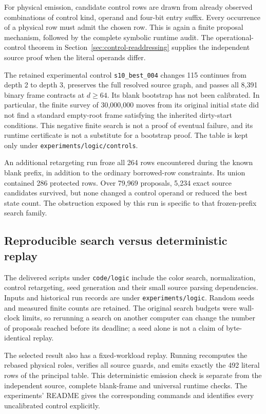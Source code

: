 For physical emission, candidate control rows are drawn from already
observed combinations of control kind, operand and four-bit entry suffix.
Every occurrence of a physical row must admit the chosen row.  This is
again a finite proposal mechanism, followed by the complete symbolic
runtime audit.  The operational-control theorem in
Section~\ref{sec:control-readdressing} supplies the independent source proof
when the literal operands differ.

The retained experimental control \texttt{s10\_best\_004} changes 115
continues from depth 2 to depth 3, preserves the full resolved source graph,
and passes all 8,391 binary frame contracts at $d\geq64$.  Its blank
bootstrap has not been calibrated.  In particular, the finite survey of
30,000,000 moves from its original initial state did not find a standard
empty-root frame satisfying the inherited dirty-start conditions.  This
negative finite search is not a proof of eventual failure, and its runtime
certificate is not a substitute for a bootstrap proof.  The table is kept
only under \texttt{experiments/logic/controls}.

An additional retargeting run froze all 264 rows encountered during the
known blank prefix, in addition to the ordinary borrowed-row constraints.
Its union contained 286 protected rows.  Over 79,969 proposals, 5,234 exact
source candidates survived, but none changed a control operand or reduced
the best state count.  The obstruction exposed by this run is specific to
that frozen-prefix search family.

\subsection{Reproducible search versus deterministic replay}

The delivered scripts under \texttt{code/logic} include the color search,
normalization, control retargeting, seed generation and their small source
parsing dependencies.  Inputs and historical run records are under
\texttt{experiments/logic}.  Random seeds and measured finite counts are
retained.  The original search budgets were wall-clock limits, so rerunning
a search on another computer can change the number of proposals reached
before its deadline; a seed alone is not a claim of byte-identical replay.

The selected result also has a fixed-workload replay.  Running
 recomputes the rebased
physical roles, verifies all source guards, and emits exactly the 492
literal rows of the principal table.  This deterministic emission check is
separate from the independent source, complete blank-frame and universal
runtime checks.  The experiments' README gives the corresponding commands
and identifies every uncalibrated control explicitly.
